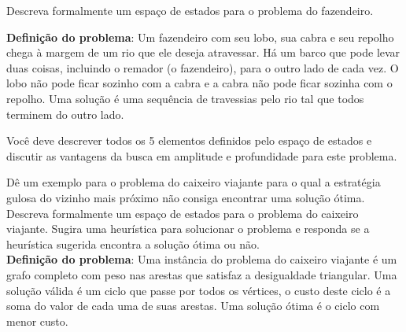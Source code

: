 \documentclass[12pt]{exam}
\begin{document}
\begin{questions}

\item Descreva formalmente um espaço de estados para o problema do fazendeiro.

\textbf{Definição do problema}: Um fazendeiro com seu lobo, sua cabra e seu repolho chega à margem de um rio que ele deseja atravessar. Há um barco que pode levar duas coisas, incluindo o remador (o fazendeiro), para o outro lado de cada vez. O lobo não pode ficar sozinho com a cabra e a cabra não pode ficar sozinha com o repolho. Uma solução é uma sequência de travessias pelo rio tal que todos terminem do outro lado.

Você deve descrever todos os 5 elementos definidos pelo espaço de estados e discutir as vantagens da busca em amplitude e profundidade para este problema.


\item Dê um exemplo para o problema do caixeiro viajante para o qual a estratégia gulosa do vizinho mais próximo não consiga encontrar uma solução ótima. Descreva formalmente um espaço de estados para o problema do caixeiro viajante. Sugira uma heurística para solucionar o problema e responda se a heurística sugerida encontra a solução ótima ou não.\\
\textbf{Definição do problema}: Uma instância do problema do caixeiro viajante é um grafo completo com peso nas arestas que satisfaz a desigualdade triangular. Uma solução válida é um ciclo que passe por todos os vértices, o custo deste ciclo é a soma do valor de cada uma de suas arestas. Uma solução ótima é o ciclo com menor custo.



%
%
%


\end{questions}
\end{document}

